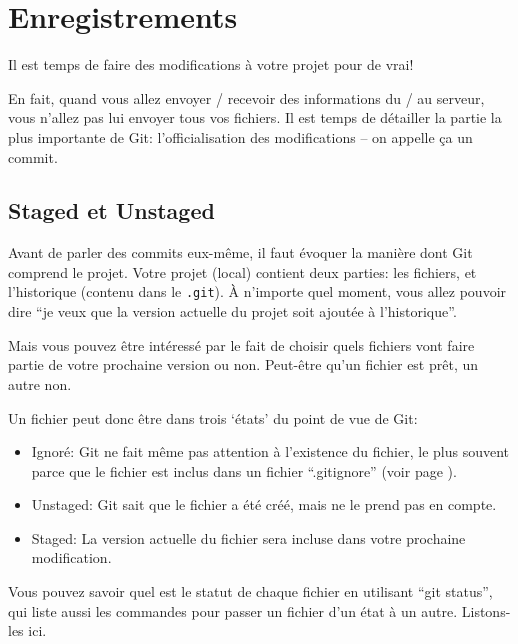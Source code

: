 \documentclass[10pt,a4paper]{article}
\begin{document}
\section{Enregistrements}

Il est temps de faire des modifications à votre projet pour de vrai!

En fait, quand vous allez envoyer / recevoir des informations du / au serveur, vous n'allez pas lui envoyer tous vos fichiers. Il est temps de détailler la partie la plus importante de Git: l'officialisation des modifications -- on appelle ça un commit.

\subsection{Staged et Unstaged\label{staged-unstaged}}

Avant de parler des commits eux-même, il faut évoquer la manière dont Git comprend le projet. Votre projet (local) contient deux parties: les fichiers, et l'historique (contenu dans le {\tt .git}). À n'importe quel moment, vous allez pouvoir dire ``je veux que la version actuelle du projet soit ajoutée à l'historique''.

Mais vous pouvez être intéressé par le fait de choisir quels fichiers vont faire partie de votre prochaine version ou non. Peut-être qu'un fichier est prêt, un autre non.

Un fichier peut donc être dans trois `états' du point de vue de Git:

\begin{itemize}
\item Ignoré: Git ne fait même pas attention à l'existence du fichier, le plus souvent parce que le fichier est inclus dans un fichier ``.gitignore'' (voir page \pageref{gitignore}).
\item Unstaged: Git sait que le fichier a été créé, mais ne le prend pas en compte.
\item Staged: La version actuelle du fichier sera incluse dans votre prochaine modification.
\end{itemize}

Vous pouvez savoir quel est le statut de chaque fichier en utilisant ``git status'', qui liste aussi les commandes pour passer un fichier d'un état à un autre. Listons-les ici.
\end{document}
